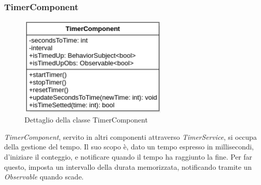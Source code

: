 \subsubsection{TimerComponent}
\begin{figure}[h]
    \centering
    \includegraphics[width=200pt]{images/prog/TimerComponent.png}
    \caption{Dettaglio della classe TimerComponent}
    \label{fig:timer}
\end{figure}
\emph{TimerComponent}, servito in altri componenti attraverso \emph{TimerService}, si occupa della gestione del tempo.
Il suo scopo è, dato un tempo espresso in millisecondi, d'iniziare il conteggio, e notificare quando il tempo ha raggiunto la fine.
Per far questo, imposta un intervallo della durata memorizzata, notificando tramite un \emph{Observable} quando scade.
